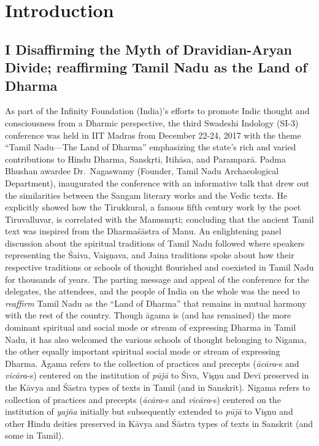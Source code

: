 
\chapter{Introduction}\label{intro}



\section*{I Disaffirming the Myth of Dravidian-Aryan Divide; reaffirming Tamil Nadu as the Land of Dharma}

\vskip 7pt

As part of the Infinity Foundation (India)’s efforts to promote Indic thought and consciousness from a Dharmic perspective, the third Swadeshi Indology (SI-3) conference was held in IIT Madras from December 22-24, 2017 with the theme “Tamil Nadu—The Land of Dharma” emphasizing the state’s rich and varied contributions to Hindu Dharma, Sanskŗti, Itihāsa, and Paramparā. Padma Bhushan awardee Dr.\ Nagaswamy (Founder, Tamil Nadu Archaeological Department), inaugurated the conference with an informative talk that drew out the similarities between the Sangam literary works and the Vedic texts. He explicitly showed how the Tirukkural, a famous fifth century work by the poet Tiruvalluvar, is correlated with the Manusmŗti; concluding that the ancient Tamil text was inspired from the Dharmaśāstra of Manu. An enlightening panel discussion about the spiritual traditions of Tamil Nadu followed where speakers representing the Śaiva, Vaişņava, and Jaina traditions spoke about how their respective traditions or schools of thought flourished and coexisted in Tamil Nadu for thousands of years. The parting message and appeal of the conference for the delegates, the attendees, and the people of India on the whole was the need to \textit{reaffirm} Tamil Nadu as the “Land of Dharma” that remains in mutual harmony with the rest of the country. Though āgama is (and has remained) the more dominant spiritual and social mode or stream of expressing Dharma in Tamil Nadu, it has also welcomed the various schools of thought belonging to Nigama, the other equally important spiritual social mode or stream of expressing Dharma. Āgama refers to the collection of practices and precepts (\textit{ācāra}-s and \textit{vicāra}-s) centered on the institution of \textit{pūjā} to Śiva, Vişņu and Devī preserved in the Kāvya and Śāstra types of texts in Tamil (and in Sanskrit). Nigama refers to collection of practices and precepts (\textit{ācāra}-s and \textit{vicāra}-s) centered on the institution of \textit{yajña} initially but subsequently extended to \textit{pūjā} to Vişņu and other Hindu deities preserved in Kāvya and Śāstra types of texts in Sanskrit (and some in Tamil).

